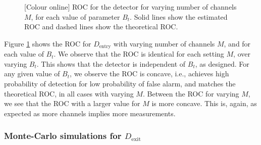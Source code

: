 \documentclass[11pt]{article}
\begin{document}
\begin{figure}[h!]
\caption{[Colour online] ROC for the detector for varying number of channels $M$, for each value of parameter $B_{t}$. Solid lines show the estimated ROC and dashed lines show the theoretical ROC.}
\label{fig:ROCdentry}
\end{figure}

Figure \ref{fig:ROCdentry} shows the ROC for $D_{\text{entry}}$ with varying number of channels $M$, and for each value of $B_{t}$. We observe that the ROC is identical for each setting $M$, over varying $B_{t}$. This shows that the detector is independent of $B_{t}$, as designed. For any given value of $B_{t}$, we observe the ROC is concave, i.e., achieves high probability of detection for low probability of false alarm, and matches the theoretical ROC, in all cases with varying $M$. Between the ROC for varying $M$, we see that the ROC with a larger value for $M$ is more concave. This is, again, as expected as more channels implies more measurements.


\subsubsection{Monte-Carlo simulations for $D_{\text{exit}}$}
\label{subsubsec:exitDetector_working}
\end{document}
